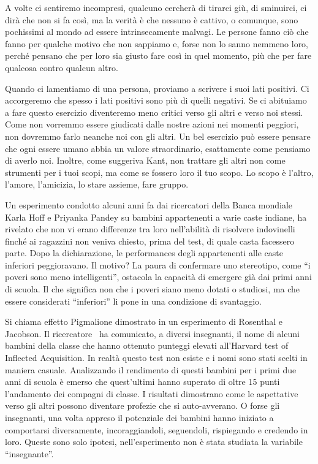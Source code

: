 \documentclass[12pt]{book} %
\begin{document}
\bigskip

A volte ci sentiremo incompresi, qualcuno cercherà di tirarci giù, di sminuirci, ci dirà che non si fa così, ma la
verità è che nessuno è cattivo, o comunque, sono pochissimi al mondo ad essere intrinsecamente malvagi. Le persone
fanno ciò che fanno per qualche motivo che non sappiamo e, forse non lo sanno nemmeno loro, perché pensano che per loro
sia giusto fare così in quel momento, più che per fare qualcosa contro qualcun altro.

Quando ci lamentiamo di una persona, proviamo a scrivere i suoi lati positivi. Ci accorgeremo che spesso i lati positivi
sono più di quelli negativi. Se ci abituiamo a fare questo esercizio diventeremo meno critici verso gli altri e verso
noi stessi. Come non vorremmo essere giudicati dalle nostre azioni nei momenti peggiori, non dovremmo farlo neanche noi
con gli altri. Un bel esercizio può essere pensare che ogni essere umano abbia un valore straordinario, esattamente
come pensiamo di averlo noi. Inoltre, come suggeriva Kant, non trattare gli altri non come strumenti per i tuoi scopi,
ma come se fossero loro il tuo scopo. Lo scopo è l'altro, l'amore, l'amicizia, lo stare assieme, fare gruppo. 


\bigskip

Un esperimento condotto alcuni anni fa dai ricercatori della Banca mondiale Karla Hoff e Priyanka Pandey su bambini
appartenenti a varie caste indiane, ha rivelato che non vi erano differenze tra loro nell'abilità di risolvere
indovinelli finché ai ragazzini non veniva chiesto, prima del test, di quale casta facessero parte. Dopo la
dichiarazione, le performances degli appartenenti alle caste inferiori peggioravano. Il motivo? La paura di confermare
uno stereotipo, come “i poveri sono meno intelligenti”, ostacola la capacità di emergere già dai primi anni di scuola.
Il che significa non che i poveri siano meno dotati o studiosi, ma che essere considerati “inferiori” li pone in una
condizione di svantaggio. 

Si chiama effetto Pigmalione dimostrato in un esperimento di Rosenthal e Jacobson. Il ricercatore \ ha comunicato, a
diversi insegnanti, il nome di alcuni bambini della classe che hanno ottenuto punteggi elevati
all'Harvard test of Inflected Acquisition. In realtà questo test non esiste e i nomi sono stati
scelti in maniera casuale. Analizzando il rendimento di questi bambini per i primi due anni di scuola è emerso che
quest'ultimi hanno superato di oltre 15 punti l'andamento dei compagni di
classe. I risultati dimostrano come le aspettative verso gli altri possono diventare profezie che si auto-avverano. O
forse gli insegnanti, una volta appreso il potenziale dei bambini hanno iniziato a comportarsi diversamente,
incoraggiandoli, seguendoli, rispiegando e credendo in loro. Queste sono solo ipotesi,
nell'esperimento non è stata studiata la variabile “insegnante”.
\end{document}
